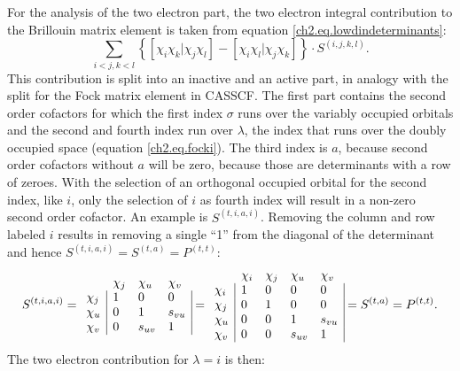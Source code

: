 For the analysis of the two electron part, the two electron integral contribution to the Brillouin matrix element is taken from equation \ref{ch2.eq.lowdindeterminants}:
\begin{equation}
\sum_{i<j,k<l} \left\{ \left[ \chi_i \chi_k | \chi_j \chi_l \right] - \left[ \chi_i \chi_l | \chi_j \chi_k \right] \right\} \cdot S^{(i,j,k,l)}.
\label{ch2.eq.ta_1el3}
\end{equation}
This contribution is split into an inactive and an active part, in analogy with the split for the Fock matrix element in CASSCF. The first part contains the second order cofactors for which the first index $\sigma$ runs over the variably occupied orbitals and the second and fourth index run over $\lambda$, the index that runs over the doubly occupied space (equation \ref{ch2.eq.focki}). The third index is $a$, because second order cofactors without $a$ will be zero, because those are determinants with a row of zeroes. With the selection of an orthogonal occupied orbital for the second index, like $i$, only the selection of $i$ as fourth index will result in a non-zero second order cofactor. An example is $S^{(t,i,a,i)}$. Removing the column and row labeled $i$ results in removing a single ``1'' from the diagonal of the determinant and hence $S^{(t,i,a,i)}=S^{(t,a)}=P^{(t,t)}$:
\begin{equation}
S^{(t,i,a,i)}=
\begin{array}{llll}
 &  \chi_j & \chi_u & \chi_v \\
 \chi_j & \multicolumn{1}{|l}{ 1 } & 0 & \multicolumn{1}{l|}{ 0 } \\
 \chi_u & \multicolumn{1}{|l}{ 0 } & 1 & \multicolumn{1}{l|}{s_{vu}} \\
 \chi_v & \multicolumn{1}{|l}{ 0 } & s_{uv} & \multicolumn{1}{l|}{1}
\end{array}=
\begin{array}{lllll}
 &  \chi_i & \chi_j & \chi_u & \chi_v \\
 \chi_i & \multicolumn{1}{|l}{ 1 } & 0 & 0 & \multicolumn{1}{l|}{ 0 } \\
 \chi_j & \multicolumn{1}{|l}{ 0 } & 1 & 0 & \multicolumn{1}{l|}{ 0 } \\
 \chi_u & \multicolumn{1}{|l}{ 0 } & 0 & 1 & \multicolumn{1}{l|}{s_{vu}} \\
 \chi_v & \multicolumn{1}{|l}{ 0 } & 0 & s_{uv} & \multicolumn{1}{l|}{1}
\end{array}=
S^{(t,a)}=P^{(t,t)}.
\label{ch2.eq.stiai-sta}
\end{equation}
The two electron contribution for $\lambda = i$ is then:
